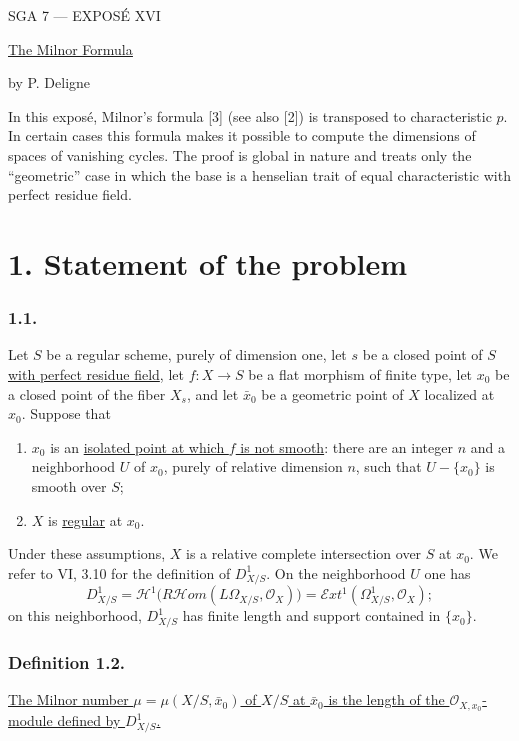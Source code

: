 \clearpage
\begin{center}
{\large SGA 7 --- EXPOS\'E XVI}\par
\vspace{2em}
{\Large\underline{\underline{The Milnor Formula}}}\par
\vspace{1.5em}
{\large by P. Deligne}
\end{center}

\medskip
In this expos\'e, Milnor's formula [3] (see also [2]) is transposed
to characteristic $p$.  In certain cases this formula makes it
possible to compute the dimensions of spaces of vanishing cycles.
The proof is global in nature and treats only the ``geometric'' case
in which the base is a henselian trait of equal characteristic with
perfect residue field.

\section*{1. Statement of the problem}

\subsubsection*{1.1.}
Let $S$ be a regular scheme, purely of dimension one, let $s$ be a
closed point of $S$ \underline{with perfect residue field}, let
$f:X\to S$ be a flat morphism of finite type, let $x_0$ be a closed
point of the fiber $X_s$, and let $\bar x_0$ be a geometric point of
$X$ localized at $x_0$.  Suppose that
\begin{enumerate}
\item[(a)] $x_0$ is an \underline{isolated point at which $f$ is not
smooth}: there are an integer $n$ and a neighborhood $U$ of $x_0$,
purely of relative dimension $n$, such that $U-\{x_0\}$ is smooth
over $S$;
\item[(b)] $X$ is \underline{regular} at $x_0$.
\end{enumerate}

Under these assumptions, $X$ is a relative complete intersection
over $S$ at $x_0$.  We refer to VI, 3.10 for the definition of
$D^1_{X/S}$.  On the neighborhood $U$ one has
\[
D^1_{X/S}
=\mathcal H^1\bigl(R\mathcal Hom(L\Omega_{X/S},\mathcal O_X)\bigr)
=\mathcal Ext^1(\Omega^1_{X/S},\mathcal O_X);
\]
on this neighborhood, $D^1_{X/S}$ has finite length and support
contained in $\{x_0\}$.

\subsubsection*{Definition 1.2.}
\underline{The Milnor number
$\mu=\mu(X/S,\bar x_0)$ of $X/S$ at $\bar x_0$ is the length of the
$\mathcal O_{X,x_0}$-module defined by $D^1_{X/S}$.}

